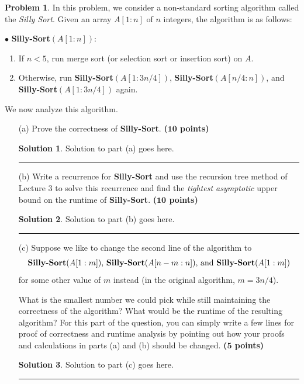 \documentclass{article}
\theoremstyle{definition}
\newtheorem{problem}{Problem}
\def\fline{\rule{0.75\linewidth}{0.5pt}}
\newcommand{\finishline}{\begin{center}\fline\end{center}}
\newtheorem*{solution*}{Solution}
\newenvironment{solution}{\begin{solution*}}{{\finishline} \end{solution*}}
\newcommand{\grade}[1]{\hfill{\textbf{($\mathbf{#1}$ points)}}}
\begin{document}
\smallskip

\begin{problem}
	In this problem, we consider a non-standard sorting algorithm called the \emph{Silly Sort}. Given an array $A[1:n]$ of $n$ integers, the algorithm is as follows: 
	
	$\bullet$ \textbf{Silly-Sort}$(A[1:n])$:
	\begin{enumerate}
		\item If $n < 5$, run merge sort (or selection sort or insertion sort) on $A$.  
		\item Otherwise, run \textbf{Silly-Sort}$(A[1:3n/4])$, \textbf{Silly-Sort}$(A[n/4:n])$, and \textbf{Silly-Sort}$(A[1:3n/4])$ again. 
	\end{enumerate} 
	
	We now analyze this algorithm. 
	
	\begin{enumerate}
		\item [(a)] Prove the correctness of  \textbf{Silly-Sort}. \grade{10} 
		
		 \begin{solution}
	Solution to part (a) goes here. %
	
\end{solution}

		\item [(b)] Write a recurrence for  \textbf{Silly-Sort} and use the recursion tree method of Lecture 3 to solve this recurrence and find the \emph{tightest asymptotic} upper bound on the runtime of \textbf{Silly-Sort}. \grade{10}
		
				    \begin{solution}
	Solution to part (b) goes here. %
\end{solution}

		\item [(c)] Suppose we like to change the second line of the algorithm to 
		\[
		\text{\textbf{Silly-Sort}$(A[1:m])$, \textbf{Silly-Sort}$(A[n-m:n])$, and \textbf{Silly-Sort}$(A[1:m])$}
		\]
		 for some other value of $m$ instead (in the original algorithm, $m = 3n/4$). 
		
		What is the smallest number we could pick while still maintaining the correctness of the algorithm? What would be the runtime of the resulting algorithm? 
		For this part of the question, you can simply write a few lines for proof of 
		correctness and runtime analysis by pointing out how your proofs and calculations in parts (a) and (b) should be changed. \grade{5}
		
				    \begin{solution}
	Solution to part (c) goes here. %
\end{solution}

	\end{enumerate}
\end{problem}
\end{document}
